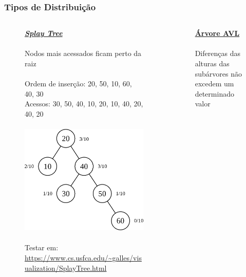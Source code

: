 \documentclass[aspectratio=169]{beamer}
\begin{document}
\begin{frame}\frametitle{Tipos de Distribuição}
\vspace{-3mm}
\begin{columns}[T]
\begin{column}{0.5\linewidth}
\begin{figure}[h]
	\centering
	\textbf{\underline{\emph{Splay Tree}}}\\
	\scriptsize{~\\
	Nodos mais acessados ficam perto da raiz\\
	~\\
	Ordem de inserção: 20, 50, 10, 60, 40, 30\\
	Acessos: 30, 50, 40, 10, 20, 10, 40, 20, 40, 20}\\
	~\\
	\includegraphics[height=0.37\paperheight]{imagens/splay01.png}\\
	~\\
	\tiny{Testar em: \url{https://www.cs.usfca.edu/~galles/visualization/SplayTree.html}}
\end{figure}
\end{column}
\begin{column}{0.5\linewidth}
\begin{figure}[h]
	\centering
	\textbf{\underline{Árvore AVL}}\\
	\scriptsize{~\\
	Diferenças das alturas das subárvores não excedem um determinado valor\\
}
\end{figure}
\end{column}
\end{columns}
\end{frame}
\end{document}
